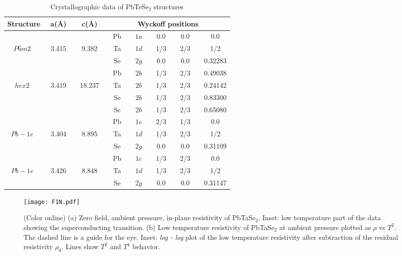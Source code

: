 \documentclass[aps,prb,preprint,groupedaddress,showpacs,amsmath,amssymb]{revtex4}
\begin{document}
\begin{table}

\caption{Crystallographic data of PbTeSe$_2$ structures} \label{T1}

\begin{tabular}{cccccccc}

\hline\hline
{Structure}&{a(\AA)}&{c(\AA)}&\multicolumn{5}{c}{Wyckoff positions} \\
\hline\hline

& & &~Pb~&~$1a$~&~0.0~&~0.0~&~0.0 \\
$P\bar{6}m2$~&~3.415~&~9.382~&~Ta~&~$1d$~&~1/3~& ~2/3~&~1/2 \\
& & &~Se~&~$2g$~&~0.0~&~0.0~&~0.32283 \\
\hline

& & &~Pb~&~$2b$~&~1/3~&~2/3~&~0.49038 \\
$hex2$~&~3.419~&~18.237~&~Ta~&~$2b$~&~1/3~& ~2/3~&~0.24142 \\
& & &~Se~&~$2b$~&~1/3~&~2/3~&~0.83300 \\
& & &~Se~&~$2b$~&~1/3~&~2/3~&~0.65080 \\
\hline

& & &~Pb~&~$1e$~&~2/3~&~1/3~&~0.0 \\
$Pb{-}1e$~&~3.404~&~8.895~&~Ta~&~$1d$~&~1/3~& ~2/3~&~1/2 \\
& & &~Se~&~$2g$~&~0.0~&~0.0~&~0.31109 \\
\hline

& & &~Pb~&~$1c$~&~1/3~&~2/3~&~0.0 \\
$Pb{-}1c$~&~3.426~&~8.848~&~Ta~&~$1d$~&~1/3~& ~2/3~&~1/2 \\
& & &~Se~&~$2g$~&~0.0~&~0.0~&~0.31147 \\
\hline

\end{tabular}

\end{table} 

\clearpage

\begin{figure}
\begin{center}
\texttt{[image: F1N.pdf]}
\end{center}
\caption{(Color online) (a) Zero field, ambient pressure, in-plane  resistivity of PbTaSe$_2$. Inset: low temperature part of the data showing the superconducting transition.  (b) Low temperature resistivity of PbTaSe$_2$ at ambient pressure plotted as $\rho$ vs $T^2$. The dashed line is a guide for the eye. Inset: {\it log - log} plot of the low temperature resistivity after subtraction of the residual resistivity $\rho_0$. Lines show $T^2$ and $T^4$ behavior. } \label{F1}
\end{figure}
\end{document}
